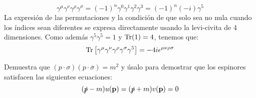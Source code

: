 \begin{solucion}
\begin{enumerate}[label=\alph*)]
		\begin{equation*}
			\gamma^\mu \gamma^\nu \gamma^\rho \gamma^\sigma = (-1)^n \gamma^0\gamma^1\gamma^2\gamma^3 = (-1)^n (-i) \gamma^5
		\end{equation*}
		La expresión de las permutaciones y la condición de que solo sea no nula cuando los índices sean diferentes se expresa directamente usando la levi-civita de 4 dimensiones. Como además $\gamma^5 \gamma^5 = 1$ y  $\Tr (1) = 4$, tenemos que:
		\begin{equation*}
			\Tr \left[ \gamma^\mu \gamma^\nu \gamma^\rho \gamma^\sigma \gamma^5 \right]  = - 4 i \epsilon^{\mu \nu \rho \sigma}
		\end{equation*}
	\end{enumerate}
\end{solucion}




\begin{ejercicio} 
	Demuestra que $(p\cdot \sigma)(p\cdot \overline{\sigma}) = m^2$ y úsalo para demostrar que los espinores satisfacen las siguientes ecuaciones:
	\begin{equation*}
		( \slashed{p} - m ) u (\mathbf{p}) = (  \slashed{p}+ m) v(\mathbf{p}) = 0
	\end{equation*}
\end{ejercicio}


